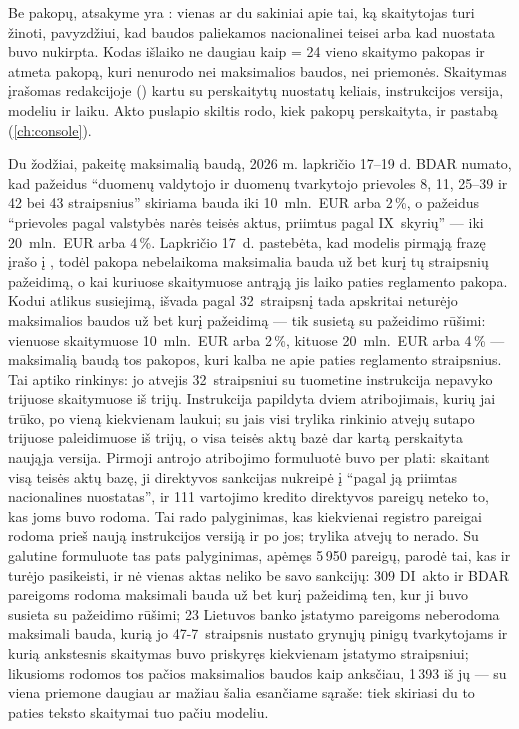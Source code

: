 Be pakopų, atsakyme yra : vienas ar du sakiniai apie tai, ką skaitytojas turi žinoti,
pavyzdžiui, kad baudos paliekamos nacionalinei teisei arba kad nuostata buvo nukirpta. Kodas
išlaiko ne daugiau kaip  = 24 vieno skaitymo pakopas ir atmeta pakopą, kuri
nenurodo nei maksimalios baudos, nei priemonės. Skaitymas įrašomas redakcijoje
() kartu su perskaitytų nuostatų keliais, instrukcijos
versija, modeliu ir laiku. Akto puslapio skiltis  rodo, kiek pakopų
perskaityta, ir pastabą (\cref{ch:console}).

\begin{lessonbox}{Du žodžiai, pakeitę maksimalią baudą, 2026 m. lapkričio 17--19 d.}
BDAR numato, kad pažeidus \enquote{duomenų valdytojo ir duomenų tvarkytojo prievoles 8, 11,
25--39 ir 42 bei 43 straipsnius} skiriama bauda iki 10~mln.~EUR arba 2\,\%, o pažeidus
\enquote{prievoles pagal valstybės narės teisės aktus, priimtus pagal IX~skyrių} --- iki
20~mln.~EUR arba 4\,\%. Lapkričio 17~d. pastebėta, kad modelis pirmąją frazę įrašo į
, todėl pakopa nebelaikoma maksimalia bauda už bet kurį tų straipsnių
pažeidimą, o kai kuriuose skaitymuose antrąją jis laiko paties reglamento pakopa. Kodui atlikus
susiejimą, išvada pagal 32~straipsnį tada apskritai neturėjo maksimalios baudos už bet kurį
pažeidimą --- tik susietą su pažeidimo rūšimi: vienuose skaitymuose 10~mln.~EUR arba 2\,\%,
kituose 20~mln.~EUR arba 4\,\% --- maksimalią baudą tos pakopos, kuri kalba ne apie paties
reglamento straipsnius. Tai aptiko rinkinys: jo atvejis 32~straipsniui su tuometine instrukcija
nepavyko trijuose skaitymuose iš trijų. Instrukcija papildyta dviem atribojimais, kurių jai
trūko, po vieną kiekvienam laukui; su jais visi trylika rinkinio atvejų sutapo trijuose
paleidimuose iš trijų, o visa teisės aktų bazė dar kartą perskaityta naująja versija. Pirmoji
antrojo atribojimo formuluotė buvo per plati: skaitant visą teisės aktų bazę, ji direktyvos
sankcijas nukreipė į \enquote{pagal ją priimtas nacionalines nuostatas}, ir 111 vartojimo
kredito direktyvos pareigų neteko to, kas joms buvo rodoma. Tai rado palyginimas, kas
kiekvienai registro pareigai rodoma prieš naują instrukcijos versiją ir po jos; trylika atvejų
to nerado. Su galutine formuluote tas pats palyginimas, apėmęs 5\,950 pareigų, parodė tai, kas
ir turėjo pasikeisti, ir nė vienas aktas neliko be savo sankcijų: 309 DI~akto ir BDAR pareigoms
rodoma maksimali bauda už bet kurį pažeidimą ten, kur ji buvo susieta su pažeidimo rūšimi; 23
Lietuvos banko įstatymo pareigoms neberodoma maksimali bauda, kurią jo 47-7~straipsnis nustato
grynųjų pinigų tvarkytojams ir kurią ankstesnis skaitymas buvo priskyręs kiekvienam įstatymo
straipsniui; likusioms rodomos tos pačios maksimalios baudos kaip anksčiau, 1\,393 iš jų --- su
viena priemone daugiau ar mažiau šalia esančiame sąraše: tiek skiriasi du to paties teksto
skaitymai tuo pačiu modeliu.
\end{lessonbox}

